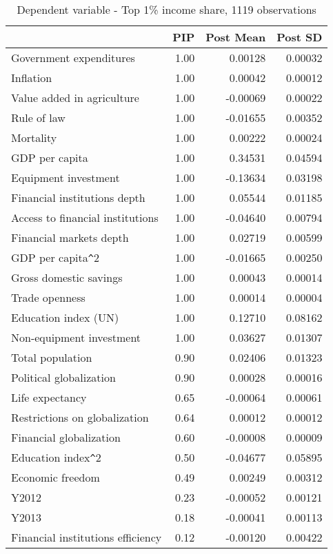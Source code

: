 \documentclass[a4paper,11pt]{article}
\begin{document}
\begin{table}[!ht]
    \footnotesize
    \centering
    \caption{Dependent variable - Top 1\% income share, 1119 observations}
    \label{table:gini1y}
    \begin{tabular}{lrrr}
      \toprule
      & PIP & Post Mean & Post SD \\
      \hline
      Government expenditures & 1.00 & 0.00128 & 0.00032 \\
  Inflation & 1.00 & 0.00042 & 0.00012 \\
  Value added in agriculture & 1.00 & -0.00069 & 0.00022 \\ 
  Rule of law & 1.00 & -0.01655 & 0.00352 \\ 
  Mortality & 1.00 & 0.00222 & 0.00024 \\ 
  GDP per capita & 1.00 & 0.34531 & 0.04594 \\
  Equipment investment & 1.00 & -0.13634 & 0.03198 \\ 
  Financial institutions depth & 1.00 & 0.05544 & 0.01185 \\ 
  Access to financial institutions & 1.00 & -0.04640 & 0.00794 \\
  Financial markets depth & 1.00 & 0.02719 & 0.00599 \\ 
  GDP per capita\verb|^|2 & 1.00 & -0.01665 & 0.00250 \\ 
  Gross domestic savings & 1.00 & 0.00043 & 0.00014 \\ 
  Trade openness & 1.00 & 0.00014 & 0.00004 \\
  Education index (UN) & 1.00 & 0.12710 & 0.08162 \\ 
  Non-equipment investment & 1.00 & 0.03627 & 0.01307 \\
  Total population & 0.90 & 0.02406 & 0.01323 \\ 
  Political globalization & 0.90 & 0.00028 & 0.00016 \\
  Life expectancy & 0.65 & -0.00064 & 0.00061 \\ 
  Restrictions on globalization & 0.64 & 0.00012 & 0.00012 \\ 
  Financial globalization & 0.60 & -0.00008 & 0.00009 \\
  Education index\verb|^|2 & 0.50 & -0.04677 & 0.05895 \\ 
  Economic freedom & 0.49 & 0.00249 & 0.00312 \\
  Y2012 & 0.23 & -0.00052 & 0.00121 \\ 
  Y2013 & 0.18 & -0.00041 & 0.00113 \\ 
  Financial institutions efficiency & 0.12 & -0.00120 & 0.00422 \\ 

\end{tabular}
\end{table}
\end{document}
